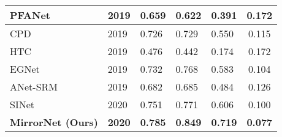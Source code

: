 \documentclass[journal]{IEEEtran}
\begin{document}
\begin{table}[!t]
\begin{tabular}{|l|l|cccc|}
\multicolumn{1}{|l|}{PFANet~\cite{pfanet}}           & \multicolumn{1}{l|}{2019}          & \multicolumn{1}{l|}{0.659}                                 & \multicolumn{1}{l|}{0.622}                                 & \multicolumn{1}{l|}{0.391}                                 & \multicolumn{1}{c|}{0.172}                                 \\ \midrule
\multicolumn{1}{|l|}{CPD~\cite{cpd}}              & \multicolumn{1}{l|}{2019}          & \multicolumn{1}{l|}{0.726}                                 & \multicolumn{1}{l|}{0.729}                                 & \multicolumn{1}{l|}{0.550}                                 & \multicolumn{1}{c|}{0.115}                                 \\ \midrule
\multicolumn{1}{|l|}{HTC~\cite{htc}}              & \multicolumn{1}{l|}{2019}          & \multicolumn{1}{l|}{0.476}                                 & \multicolumn{1}{l|}{0.442}                                 & \multicolumn{1}{l|}{0.174}                                 & \multicolumn{1}{c|}{0.172}                                 \\ \midrule
\multicolumn{1}{|l|}{EGNet~\cite{egnet}}            & \multicolumn{1}{l|}{2019}          & \multicolumn{1}{l|}{0.732}                                 & \multicolumn{1}{l|}{0.768}                                 & \multicolumn{1}{l|}{0.583}                                 & \multicolumn{1}{c|}{0.104}                                 \\ \midrule
\multicolumn{1}{|l|}{ANet-SRM~\cite{CAMO}}         & \multicolumn{1}{l|}{2019}          & \multicolumn{1}{l|}{0.682}                                 & \multicolumn{1}{l|}{0.685}                                 & \multicolumn{1}{l|}{0.484}                                 & \multicolumn{1}{c|}{0.126}                                 \\ \midrule
\multicolumn{1}{|l|}{SINet~\cite{sinet}}            & \multicolumn{1}{l|}{2020}          & \multicolumn{1}{l|}{0.751}                                 & \multicolumn{1}{l|}{0.771}                                 & \multicolumn{1}{l|}{0.606}                                 & \multicolumn{1}{c|}{0.100}                                 \\ \midrule
\multicolumn{1}{|l|}{\textbf{MirrorNet (Ours)}}        & \multicolumn{1}{l|}{\textbf{2020}}          & \multicolumn{1}{l|}{{\color{blue} \textbf{0.785}}} & \multicolumn{1}{l|}{{\color{blue} \textbf{0.849}}} & \multicolumn{1}{l|}{{\color{blue} \textbf{0.719}}} & \multicolumn{1}{c|}{{\color{blue} \textbf{0.077}}} \\ \bottomrule
             
\end{tabular}
\end{table}
\end{document}
